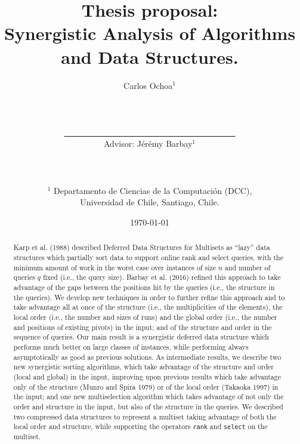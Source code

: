 \documentclass[10pt]{article}
\title{Thesis proposal: \\Synergistic Analysis of Algorithms and Data Structures.}
\author{Carlos Ochoa$^{1}$
  \\\\\\\\\underline{\ \ \ \ \ \ \ \ \ \ \ \ \ \ \ \ \ \ \ \ \ \ \ \ \
    \ \ \ \ \ \ \ \ \ \ \ \ \ \ \ \ }
  \\Advisor: J\'er\'emy Barbay$^1$\\\\\\\\
  $^1$ Departamento de Ciencias de la Computaci\'on (DCC),\\ Universidad de Chile, Santiago, Chile.
}
\date{\today}
\begin{document}
\maketitle
\begin{abstract}
  Karp et al. (1988) described Deferred Data Structures for Multisets
  as ``lazy'' data structures which partially sort data to support
  online rank and select queries, with the minimum amount of work in
  the worst case over instances of size $n$ and number of queries $q$
  fixed (i.e., the query size). Barbay et al. (2016) refined this
  approach to take advantage of the gaps between the positions hit by
  the queries (i.e., the structure in the queries). We develop new
  techniques in order to further refine this approach and to take
  advantage all at once of the structure (i.e., the multiplicities of
  the elements), the local order (i.e., the number and sizes of runs)
  and the global order (i.e., the number and positions of existing
  pivots) in the input; and of the structure and order in the sequence
  of queries. Our main result is a synergistic deferred data structure
  which performs much better on large classes of instances, while
  performing always asymptotically as good as previous solutions. As
  intermediate results, we describe two new synergistic sorting
  algorithms, which take advantage of the structure and order (local
  and global) in the input, improving upon previous results which take
  advantage only of the structure (Munro and Spira 1979) or of the
  local order (Takaoka 1997) in the input; and one new multiselection
  algorithm which takes advantage of not only the order and structure
  in the input, but also of the structure in the queries.  We
  described two compressed data structures to represent a multiset
  taking advantage of both the local order and structure, while
  supporting the operators \texttt{rank} and \texttt{select} on the
  multiset.
\end{abstract}
\clearpage





\end{document}
